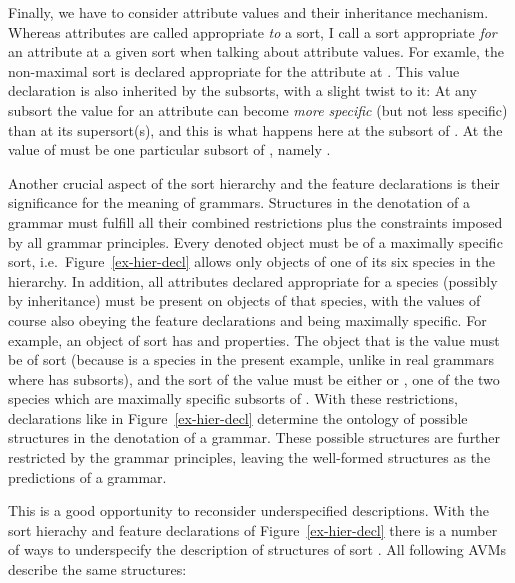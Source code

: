 \documentclass[output=paper
                ,modfonts
                ,nonflat
	        ,collection
	        ,collectionchapter
	        ,collectiontoclongg
 	        ,biblatex
                ,babelshorthands
                ,newtxmath
                ,draftmode
                ,colorlinks, citecolor=brown
]{./langsci/langscibook}
\begin{document}
{Finally, we have to consider attribute values and their inheritance
mechanism. Whereas attributes are called appropriate \emph{to} a sort,
I call a sort appropriate \emph{for} an attribute at a given sort when
talking about attribute values. For examle, the non-maximal sort
 is declared appropriate for the attribute 
at . This value declaration is also inherited by the
subsorts, with a slight twist to it: At any subsort the value for an
attribute can become \emph{more specific} (but not less specific) than
at its supersort(s), and this is what happens here at the subsort
 of .  At  the value of
 must be one particular subsort of , namely
.

Another crucial aspect of the sort hierarchy and the feature
declarations is their significance for the meaning of
grammars. Structures in the denotation of a grammar must fulfill all
their combined restrictions plus the constraints imposed by all
grammar principles. Every denoted object must be of a maximally
specific sort, i.e.\ Figure~\ref{ex-hier-decl} allows only objects of
one of its six species in the hierarchy. In addition, all attributes
declared appropriate for a species (possibly by inheritance) must be
present on objects of that species, with the values of course also
obeying the feature declarations and being maximally specific. For
example, an object of sort  has  and
 properties. The object that is the  value
must be of sort  (because  is a species in the
present example, unlike in real grammars where  has
subsorts), and the sort of the  value must be either
 or , one of the two species which are
maximally specific subsorts of .  With these
restrictions, declarations like in Figure~\ref{ex-hier-decl} determine
the ontology of possible structures in the denotation of a
grammar. These possible structures are further restricted by the
grammar principles, leaving the well-formed structures as the
predictions of a grammar.

This is a good opportunity to reconsider underspecified descriptions.
With the sort hierachy and feature declarations of Figure~\ref{ex-hier-decl}
there is a number of ways to underspecify the description of structures
of sort . All following AVMs describe the same structures:

}
\end{document}
